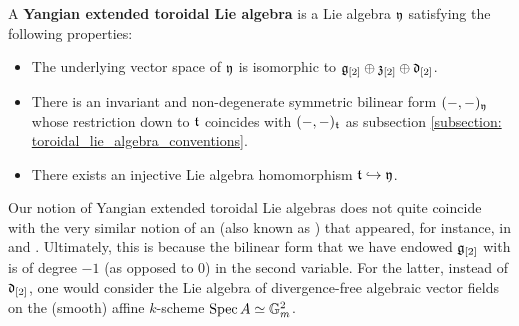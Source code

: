         \begin{definition} \label{def: yangian_extended_toroidal_lie_algebras}
            A \textbf{Yangian extended toroidal Lie algebra} is a Lie algebra $\mathfrak{y}$ satisfying the following properties:
            \begin{itemize}
                \item The underlying vector space of $\mathfrak{y}$ is isomorphic to $\mathfrak{g}_{[2]} \oplus \mathfrak{z}_{[2]} \oplus \mathfrak{d}_{[2]}$.
                \item There is an invariant and non-degenerate symmetric bilinear form $(-, -)_{\mathfrak{y}}$ whose restriction down to $\mathfrak{t}$ coincides with $(-, -)_{\mathfrak{t}}$ as subsection \ref{subsection: toroidal_lie_algebra_conventions}.
                \item There exists an injective Lie algebra homomorphism $\mathfrak{t} \hookrightarrow \mathfrak{y}$.
            \end{itemize}
        \end{definition}
        \begin{remark}
            Our notion of Yangian extended toroidal Lie algebras does not quite coincide with the very similar notion of an  (also known as ) that appeared, for instance, in \cite{billig_representations_of_toroidal_extended_affine_lie_algebras} and \cite{neher_lectures_on_EALAs}. Ultimately, this is because the bilinear form that we have endowed $\mathfrak{g}_{[2]}$ with is of degree $-1$ (as opposed to $0$) in the second variable. For the latter, instead of $\mathfrak{d}_{[2]}$, one would consider the Lie algebra of divergence-free algebraic vector fields on the (smooth) affine $k$-scheme $\operatorname{Spec} A \simeq \mathbb{G}_m^2$.
        \end{remark}

